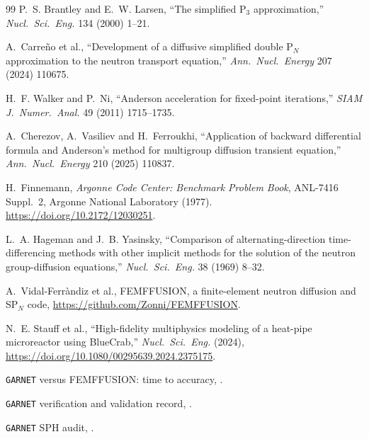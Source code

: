 \documentclass[a4paper,10pt]{article}
\newcommand{\garnet}{\texttt{GARNET}}
\begin{document}
\begin{thebibliography}{99}
P.~S. Brantley and E.~W. Larsen, ``The simplified P$_3$ approximation,''
\emph{Nucl.\ Sci.\ Eng.} 134 (2000) 1--21.

A.~Carre\~no et al., ``Development of a diffusive simplified double P$_N$
approximation to the neutron transport equation,'' \emph{Ann.\ Nucl.\ Energy}
207 (2024) 110675.

H.~F. Walker and P.~Ni, ``Anderson acceleration for fixed-point iterations,''
\emph{SIAM J.\ Numer.\ Anal.} 49 (2011) 1715--1735.

A.~Cherezov, A.~Vasiliev and H.~Ferroukhi, ``Application of backward differential
formula and Anderson's method for multigroup diffusion transient equation,''
\emph{Ann.\ Nucl.\ Energy} 210 (2025) 110837.

H.~Finnemann, \emph{Argonne Code Center: Benchmark Problem Book}, ANL-7416
Suppl.~2, Argonne National Laboratory (1977).
\url{https://doi.org/10.2172/12030251}.

L.~A. Hageman and J.~B. Yasinsky, ``Comparison of alternating-direction
time-differencing methods with other implicit methods for the solution of the
neutron group-diffusion equations,'' \emph{Nucl.\ Sci.\ Eng.} 38 (1969) 8--32.

A.~Vidal-Ferr\`andiz et al., FEMFFUSION, a finite-element neutron diffusion and
SP$_N$ code, \url{https://github.com/Zonni/FEMFFUSION}.

N.~E. Stauff et al., ``High-fidelity multiphysics modeling of a heat-pipe
microreactor using BlueCrab,'' \emph{Nucl.\ Sci.\ Eng.} (2024),
\url{https://doi.org/10.1080/00295639.2024.2375175}.

\garnet{} versus FEMFFUSION: time to accuracy,
.

\garnet{} verification and validation record, .

\garnet{} SPH audit, .
\end{thebibliography}
\end{document}
